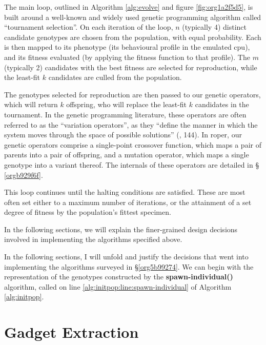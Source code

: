 \documentclass[12pt,glossary]{dalthesis}
\begin{document}
The main loop, outlined in Algorithm \ref{alg:evolve} and figure \ref{fig:org1a2f5d5},
is built around a well-known and widely used genetic programming algorithm
called ``tournament selection''. On each iteration of the loop, \(n\) (typically 4)
distinct candidate genotypes are chosen from the population, with equal
probability. Each is then mapped to its phenotype (its behavioural profile in
the emulated \gls{cpu}), and its fitness evaluated (by applying the fitness
function to that profile). The \(m\) (typically 2) candidates with the best
fitness are selected for reproduction, while the least-fit \(k\) candidates are
culled from the population.

The genotypes selected for reproduction are then passed to our genetic
operators, which will return \(k\) offspring, who will replace the least-fit \(k\)
candidates in the tournament. In the genetic programming literature, these
operators are often referred to as the ``variation operators'', as they ``define the
manner in which the system moves through the space of possible solutions''
(\cite{banzhaf98}, 144). In \gls{roper}, our genetic operators comprise a
single-point crossover function, which maps a pair of parents into a pair of
offspring, and a mutation operator, which maps a single genotype into a variant
thereof. The internals of these operators are detailed in \S
\ref{orgb929f6f}.

This loop continues until the halting conditions are satisfied. These are most
often set either to a maximum number of iterations, or the attainment of a set
degree of fitness by the population's fittest specimen.

In the following sections, we will explain the finer-grained design decisions
involved in implementing the algorithms specified above. 

In the following sections, I will unfold and justify the decisions that went into
implementing the algorithms surveyed in \S \ref{org5b99274}.
We can begin with the representation of the genotypes constructed by
the \textbf{spawn-individual()} algorithm, called on line
\ref{alg:initpop:line:spawn-individual} of Algorithm \ref{alg:initpop}.

\section{Gadget Extraction}
\label{sec:org324c199}
\label{orgec511c2}
\end{document}
